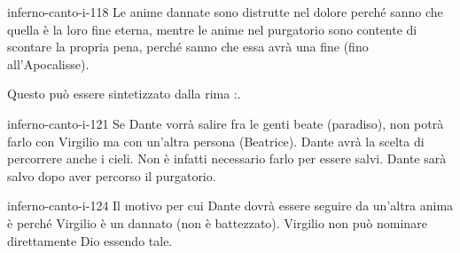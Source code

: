 \documentclass[preview]{standalone}
\begin{document}
\begin{snippet}{inferno-canto-i-118}
    Le anime dannate sono distrutte nel dolore perché sanno che quella è la loro
    fine eterna, mentre le anime nel purgatorio sono contente di scontare la propria pena,
    perché sanno che essa avrà una fine (fino all'Apocalisse).

    Questo può essere sintetizzato dalla rima :.
\end{snippet}    

\begin{snippet}{inferno-canto-i-121}
    Se Dante vorrà salire fra le genti beate (paradiso), non potrà farlo con Virgilio
    ma con un'altra persona (Beatrice).
    Dante avrà la scelta di percorrere anche i cieli. Non è infatti necessario
    farlo per essere salvi. Dante sarà salvo dopo aver percorso il purgatorio.
\end{snippet}

\begin{snippet}{inferno-canto-i-124}
    Il motivo per cui Dante dovrà essere seguire da un'altra anima
    è perché Virgilio è un dannato (non è battezzato). 
    Virgilio non può nominare direttamente Dio essendo tale.
\end{snippet}
\end{document}
